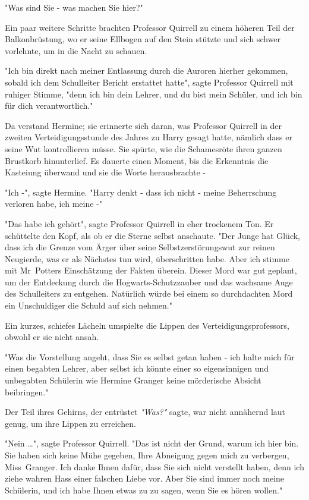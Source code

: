 {"Was sind Sie - was machen Sie hier?"

Ein paar weitere Schritte brachten Professor Quirrell zu einem höheren Teil der Balkonbrüstung, wo er seine Ellbogen auf den Stein stützte und sich schwer vorlehnte, um in die Nacht zu schauen.

"Ich bin direkt nach meiner Entlassung durch die Auroren hierher gekommen, sobald ich dem Schulleiter Bericht erstattet hatte", sagte Professor Quirrell mit ruhiger Stimme, "denn ich bin dein Lehrer, und du bist mein Schüler, und ich bin für dich verantwortlich."

Da verstand Hermine; sie erinnerte sich daran, was Professor Quirrell in der zweiten Verteidigungsstunde des Jahres zu Harry gesagt hatte, nämlich dass er seine Wut kontrollieren müsse. Sie spürte, wie die Schamesröte ihren ganzen Brustkorb hinunterlief. Es dauerte einen Moment, bis die Erkenntnis die Kasteiung überwand und sie die Worte herausbrachte -

"Ich -", sagte Hermine. "Harry denkt - dass ich nicht - meine Beherrschung verloren habe, ich meine -"

"Das habe ich gehört", sagte Professor Quirrell in eher trockenem Ton. Er schüttelte den Kopf, als ob er die Sterne selbst anschaute. "Der Junge hat Glück, dass ich die Grenze vom Ärger über seine Selbstzerstörungswut zur reinen Neugierde, was er als Nächstes tun wird, überschritten habe. Aber ich stimme mit Mr~Potters Einschätzung der Fakten überein. Dieser Mord war gut geplant, um der Entdeckung durch die Hogwarts-Schutzzauber und das wachsame Auge des Schulleiters zu entgehen. Natürlich würde bei einem so durchdachten Mord ein Unschuldiger die Schuld auf sich nehmen."

Ein kurzes, schiefes Lächeln umspielte die Lippen des Verteidigungsprofessors, obwohl er sie nicht ansah.

"Was die Vorstellung angeht, dass Sie es selbst getan haben - ich halte mich für einen begabten Lehrer, aber selbst ich könnte einer so eigensinnigen und unbegabten Schülerin wie Hermine Granger keine mörderische Absicht beibringen."

Der Teil ihres Gehirns, der entrüstet \emph{"Was?"} sagte, war nicht annähernd laut genug, um ihre Lippen zu erreichen.

"Nein …", sagte Professor Quirrell. "Das ist nicht der Grund, warum ich hier bin. Sie haben sich keine Mühe gegeben, Ihre Abneigung gegen mich zu verbergen, Miss~Granger. Ich danke Ihnen dafür, dass Sie sich nicht verstellt haben, denn ich ziehe wahren Hass einer falschen Liebe vor. Aber Sie sind immer noch meine Schülerin, und ich habe Ihnen etwas zu zu sagen, wenn Sie es hören wollen."

}
